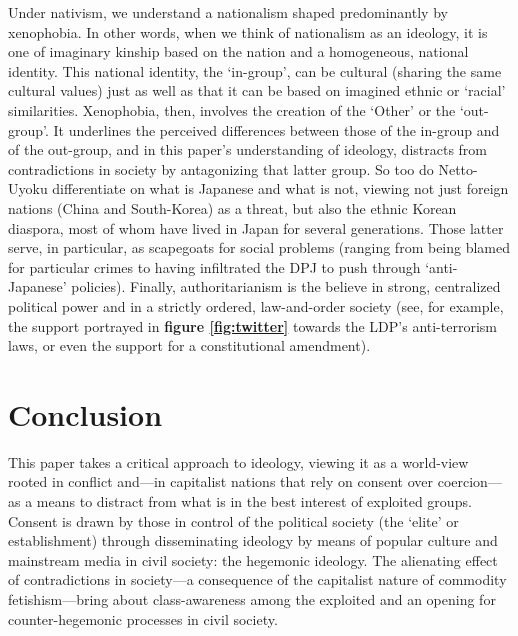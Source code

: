 \documentclass[10pt,british,A4paper,oneside]{memoir}
\begin{document}
Under nativism, we understand a nationalism shaped predominantly by
xenophobia. In other words, when we think of nationalism as an ideology,
it is one of imaginary kinship based on the nation and a homogeneous,
national identity. This national identity, the `in-group', can be
cultural (sharing the same cultural values) just as well as that it can
be based on imagined ethnic or `racial' similarities. Xenophobia, then,
involves the creation of the `Other' or the `out-group'. It underlines
the perceived differences between those of the in-group and of the
out-group, and in this paper's understanding of ideology, distracts from
contradictions in society by antagonizing that latter group. So too do
Netto-Uyoku differentiate on what is Japanese and what is not, viewing
not just foreign nations (China and South-Korea) as a threat, but also
the ethnic Korean diaspora, most of whom have lived in Japan for
several generations. Those latter serve, in particular, as scapegoats for
social problems (ranging from being blamed for particular crimes to
having infiltrated the DPJ to push through `anti-Japanese' policies).
Finally, authoritarianism is the believe in strong, centralized
political power and in a strictly ordered, law-and-order society (see,
for example, the support portrayed in \textbf{figure \ref{fig:twitter}}
towards the LDP's anti-terrorism laws, or even the support for a
constitutional amendment).

\section{Conclusion}\label{conclusion-1}

This paper takes a critical approach to ideology, viewing it as a
world-view rooted in conflict and---in capitalist nations that rely on
consent over coercion---as a means to distract from what is in the best
interest of exploited groups. Consent is drawn by those in control of the
political society (the `elite' or establishment) through disseminating
ideology by means of popular culture and mainstream media in civil
society: the hegemonic ideology. The alienating effect of contradictions
in society---a consequence of the capitalist nature of commodity
fetishism---bring about class-awareness among the exploited and an
opening for counter-hegemonic processes in civil society.
\end{document}
